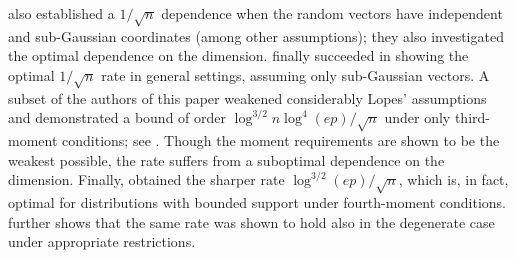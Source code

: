\documentclass[aos]{imsart}
\begin{document}
\cite{das2020central} also established a $1/\sqrt{n}$ dependence when the random vectors have independent and sub-Gaussian coordinates (among other assumptions); they also investigated the optimal dependence on the dimension. \cite{lopes2020central} finally succeeded in showing the optimal $1/\sqrt{n}$ rate in general settings, assuming only sub-Gaussian vectors. A subset of the authors of this paper weakened considerably  Lopes' assumptions and demonstrated  a bound of order $\log^{3/2}n \log^4(ep)/ \sqrt{n}$ under only third-moment conditions; see . Though the moment requirements are shown to be the weakest possible, the rate suffers from a suboptimal dependence on the dimension. Finally,  obtained the sharper rate  $\log^{3/2}(ep)/\sqrt{n}$, which is, in fact, optimal for distributions with bounded support under fourth-moment conditions. \cite{koike.degenerate} further shows that the same rate was shown to hold also in the degenerate case under appropriate restrictions. 

\end{document}

